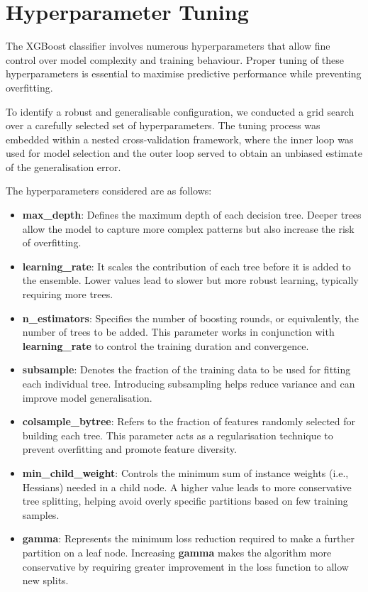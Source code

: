 \documentclass[12pt, a4paper]{report}
\begin{document}
\section{Hyperparameter Tuning}

The XGBoost classifier involves numerous hyperparameters that allow fine control over model complexity and training behaviour. Proper tuning of these hyperparameters is essential to maximise predictive performance while preventing overfitting.

To identify a robust and generalisable configuration, we conducted a grid search over a carefully selected set of hyperparameters. The tuning process was embedded within a nested cross-validation framework, where the inner loop was used for model selection and the outer loop served to obtain an unbiased estimate of the generalisation error.

The hyperparameters considered are as follows:

\begin{itemize}
    \item \textbf{max\_depth}: Defines the maximum depth of each decision tree. Deeper trees allow the model to capture more complex patterns but also increase the risk of overfitting.
    
    \item \textbf{learning\_rate}: It scales the contribution of each tree before it is added to the ensemble. Lower values lead to slower but more robust learning, typically requiring more trees.

    \item \textbf{n\_estimators}: Specifies the number of boosting rounds, or equivalently, the number of trees to be added. This parameter works in conjunction with \textbf{learning\_rate} to control the training duration and convergence.

    \item \textbf{subsample}: Denotes the fraction of the training data to be used for fitting each individual tree. Introducing subsampling helps reduce variance and can improve model generalisation.

    \item \textbf{colsample\_bytree}: Refers to the fraction of features randomly selected for building each tree. This parameter acts as a regularisation technique to prevent overfitting and promote feature diversity.

    \item \textbf{min\_child\_weight}: Controls the minimum sum of instance weights (i.e., Hessians) needed in a child node. A higher value leads to more conservative tree splitting, helping avoid overly specific partitions based on few training samples.

    \item \textbf{gamma}: Represents the minimum loss reduction required to make a further partition on a leaf node. Increasing \textbf{gamma} makes the algorithm more conservative by requiring greater improvement in the loss function to allow new splits.
\end{itemize}
\end{document}
